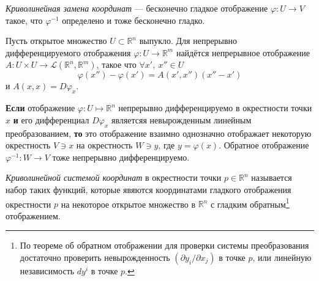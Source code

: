 
\begin{to_def} 
    \textit{Криволинейная замена координат} --- бесконечно гладкое отображение $\varphi \colon U \to V$ такое, что $\varphi^{-1}$ определено и тоже бесконечно гладко. 
\end{to_def}

\begin{to_lem} 
    Пусть открытое множество $U \subset \mathbb{R}^n $ выпукло. Для непрерывно дифференцируемого отображения $\varphi \colon U \to \mathbb{R}^m $ найдётся непрерывное отображение $A \colon U \times U \to \mathcal L (\mathbb{R}^n, \mathbb{R}^m)$, такое что $\forall x', \ x'' \in U$ 
\begin{equation*}
     \varphi(x'') - \varphi(x') = A(x', x'')(x'' - x')
 \end{equation*} 
 и $A(x, x) = D \varphi_x$.  
\end{to_lem}


\begin{to_thr}
     \textbf{Если} отображение $\varphi \colon U \mapsto \mathbb{R}^n$ непрерывно дифференцируемо в окрестности точки $x$ \textbf{и} его дифференциал $D\varphi_x$ являетсяя невырожденным линейным преобразованием, \textbf{то} это отображение взаимно однозначно отображает некоторую окрестность $V \ni x$ на окрестность $W \ni y$, где $y = \varphi(x)$. Обратное отображение $\varphi^{-1} \colon W \to V$ тоже непрерывно дифференцируемо. 
\end{to_thr}


\begin{to_def} 
    \textit{Криволинейной системой координат} в окрестности точки $p \in \mathbb{R}^n$ называется набор таких функций, которые явяются координатами гладкого отображения окрестности $p$ на некоторое открытое множество в $\mathbb{R}^n$ с гладким обратным\footnote{
        По теореме об обратном отображении для проверки системы преобразования достаточно проверить невырожденность $\left(
    \partial y_i / \partial x_j
    \right)$ в точке $p$, или линейную независимость $dy^i$ в точке $p$.
    } отображением.
\end{to_def}

